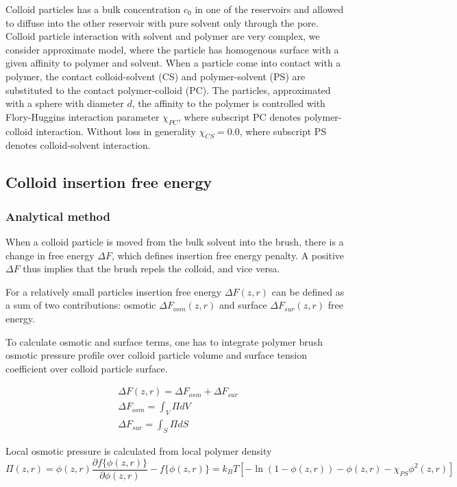 \documentclass[12pt, a4paper]{article}
\begin{document}
Colloid particles has a bulk concentration $c_0$ in one of the reservoirs and allowed to diffuse into the other reservoir with pure solvent only through the pore.
Colloid particle interaction with solvent and polymer are very complex, we consider approximate model, where the particle has homogenous surface with a given affinity to polymer and solvent.
When a particle come into contact with a polymer, the contact colloid-solvent (CS) and polymer-solvent (PS) are substituted to the contact polymer-colloid (PC).
The particles, approximated with a sphere with diameter $d$, the affinity to the polymer is controlled with Flory-Huggins interaction parameter $\chi_{PC}$, where subscript PC denotes polymer-colloid interaction. Without loss in generality $\chi_{CS}=0.0$, where subscript PS denotes colloid-solvent interaction.

\subsection{Colloid insertion free energy}
\subsubsection*{Analytical method}
When a colloid particle is moved from the bulk solvent into the brush, there is a change in free energy $\Delta F$, which defines insertion free energy penalty. A positive $\Delta F$ thus implies that the brush repels the colloid, and vice versa.

For a relatively small particles insertion free energy $\Delta F(z,r)$ can be defined as a sum of two contributions: osmotic $\Delta F_{osm}(z,r)$ and surface $\Delta F_{sur}(z,r)$ free energy.

To calculate osmotic and surface terms, one has to integrate polymer brush osmotic pressure profile over colloid particle volume and surface tension coefficient over colloid particle surface.

\begin{eqnarray}
    \Delta F(z,r) = \Delta F_{osm} + \Delta F_{sur}
    \\
    \Delta F_{osm} = \int_{V} \Pi dV
    \\
    \Delta F_{sur} = \int_{S} \Pi dS
\end{eqnarray}

Local osmotic pressure is calculated from local polymer density
\begin{equation}
	\Pi(z,r)=  \phi(z,r)\frac{\partial f\{\phi(z,r)\}}{\partial \phi(z,r)} - f\{\phi(z,r)\}= 
	k_BT[-\ln(1-\phi(z,r)) - \phi(z,r) -\chi_{PS}\phi^2(z,r)]
\end{equation}
\end{document}
